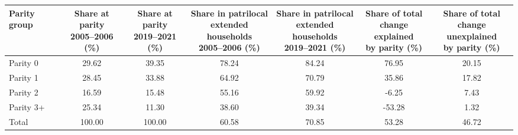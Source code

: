 \begin{tabular}{lcccccc}
\toprule
Parity group & \makecell{Share at parity\\2005--2006 (\%)} & \makecell{Share at parity\\2019--2021 (\%)} & \makecell{Share in patrilocal\\extended households\\2005--2006 (\%)} & \makecell{Share in patrilocal\\extended households\\2019--2021 (\%)} & \makecell{Share of total \\ change explained \\ by parity (\%)} & \makecell{Share of total \\ change unexplained \\ by parity (\%)} \\
\midrule
Parity 0&29.62&39.35&78.24&84.24&76.95&20.15\\
Parity 1&28.45&33.88&64.92&70.79&35.86&17.82\\
Parity 2&16.59&15.48&55.16&59.92&-6.25&7.43\\
Parity 3+&25.34&11.30&38.60&39.34&-53.28&1.32\\
Total&100.00&100.00&60.58&70.85&53.28&46.72\\
\bottomrule
\end{tabular}

